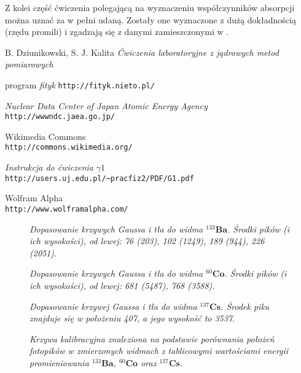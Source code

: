 \documentclass[10pt, twocolumn]{article}
\begin{document}
Z kolei część ćwiczenia polegającą na wyznaczeniu współczynników absorpcji można uznać za w pełni udaną. Zostały one wyznaczone z dużą dokładnością (rzędu promili) i zgadzają się z danymi zamieszczonymi w \cite{prac}.


\begin{thebibliography}{00}
B. Dziunikowski, S. J. Kalita \emph{Ćwiczenia laboratoryjne z jądrowych metod pomiarowych}

program \emph{fityk} \verb|http://fityk.nieto.pl/|

\emph{Nuclear Data Center of Japan Atomic Energy Agency} \verb|http://wwwndc.jaea.go.jp/|

Wikimedia Commons \\ \verb|http://commons.wikimedia.org/|

\emph{Instrukcja do ćwiczenia $\gamma1$} \\\verb|http://users.uj.edu.pl/~pracfiz2/PDF/G1.pdf|

Wolfram Alpha \\ \verb|http://www.wolframalpha.com/|
\end{thebibliography}


\begin{figure}
  \caption{\em Dopasowanie krzywych Gaussa i tła do widma $^{133}\mathbf{Ba}$. Środki pików (i ich wysokości), od lewej: 76 (203), 102 (1249), 189 (944), 226 (2051). }
  \label{fit_ba}
\end{figure}
\begin{figure}
  \caption{\em Dopasowanie krzywych Gaussa i tła do widma $^{60}\mathbf{Co}$. Środki pików (i ich wysokości), od lewej: 681 (5487), 768 (3588). }
  \label{fit_co}
\end{figure}
\begin{figure}
  \caption{\em Dopasowanie krzywej Gaussa i tła do widma $^{137}\mathbf{Cs}$. Środek piku znajduje się w położeniu 407, a jego wysokość to 3537.}
  \label{fit_cs}
\end{figure}

\begin{figure}
  \caption{\em Krzywa kalibracyjna znaleziona na podstawie porównania położeń fotopików w zmierzonych widmach z tablicowymi \cite{NuclearDataCenter} wartościami energii promieniowania $^{133}\mathbf{Ba}$, $^{60}\mathbf{Co}$ oraz $^{137}\mathbf{Cs}$.}
  \label{kalibracja}
\end{figure}
\end{document}
